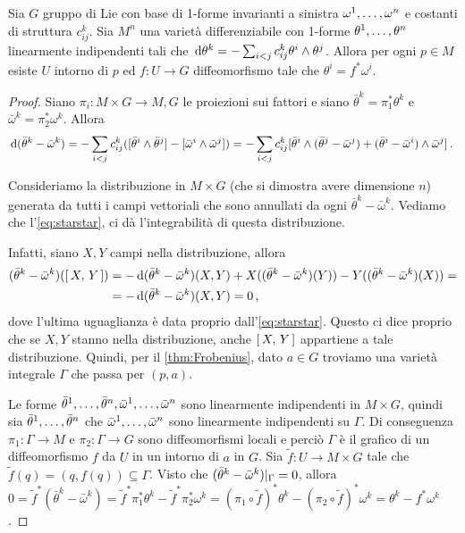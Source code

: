 \begin{theorem}
	Sia $G$ gruppo di Lie con base di 1-forme invarianti a sinistra $\seqa \omega n,$ e costanti di struttura $c_{ij}^k$. Sia $M^n$ una varietà differenziabile con 1-forme $\seqa \theta n,$ linearmente indipendenti tali che $\de \theta^k = - \sum_{i<j} c_{ij}^k \theta^i\wedge \theta^j$.
	Allora per ogni $p\in M$ esiste $U$ intorno di $p$ ed $f: U \to G$ diffeomorfismo tale che $\theta^i = f^*\omega^i$. 
\end{theorem}
\begin{proof}
	Siano $\pi_i : M \times G\to M,G$ le proiezioni sui fattori e siano $\bar\theta^k = \pi_1^*\theta^k$ e $\bar \omega^k = \pi_2^* \omega^k$.
	Allora
	\begin{equation} \label{eq:starstar}
		\de (\bar \theta^k - \bar \omega^k) = -\sum_{i<j} c_{ij}^k ([\bar \theta^i \wedge \bar \theta^j] - [\bar \omega^i \wedge \bar \omega^j]) = - \sum_{i<j} c_{ij}^k [\bar \theta^i \wedge (\bar\theta^j - \bar \omega^j) + (\bar\theta^i - \bar \omega^i)\wedge \bar \omega^j] \punto
	\end{equation}
	
	Consideriamo la distribuzione in $M\times G$ (che si dimostra avere dimensione $n$) generata da tutti i campi vettoriali che sono annullati da ogni $\bar \theta^k - \bar \omega^k$. Vediamo che l'\cref{eq:starstar}, ci dà l'integrabilità di questa distribuzione.
	
	Infatti, siano $X,Y$ campi nella distribuzione, allora
		\begin{align*}
			(\bar\theta^k - \bar\omega^k) (\comm{X}{ Y}) &= -\de (\bar\theta^k - \bar\omega^k)(X, Y) + X((\bar\theta^k - \bar\omega^k)(Y)) - Y((\bar\theta^k - \bar\omega^k) (X)) =\\
			&= - \de (\bar\theta^k - \bar\omega^k) (X,Y) = 0\virgola
		\end{align*}
		dove l'ultima uguaglianza è data proprio dall'\cref{eq:starstar}. Questo ci dice proprio che se $X,Y$ stanno nella distribuzione, anche $\comm XY$ appartiene a tale distribuzione.	
	Quindi, per il \cref{thm:Frobenius}, dato $a \in G$ troviamo una varietà integrale $\Gamma$ che passa per $(p,a)$.
	
	Le forme $\seqa {\bar \theta}n, , \seqa {\bar\omega}n,$ sono linearmente indipendenti in $M\times G$, quindi sia $\seqa{\bar\theta}n,$ che $\seqa {\bar\omega}n,$ sono linearmente indipendenti su $\Gamma$.
	Di conseguenza $\pi_1: \Gamma \to M$ e $\pi_2: \Gamma \to G$ sono diffeomorfismi locali e perciò $\Gamma$ è il grafico di un diffeomorfismo $f$ da $U$ in un intorno di $a$ in $G$.
	Sia $\tilde f: U \to M\times G$ tale che $\tilde f(q) = (q,f(q)) \subseteq \Gamma$.
	Visto che $(\bar\theta^k - \bar\omega^k)\restrict \Gamma = 0$, allora $0 = \tilde f^*(\bar\theta^k - \bar\omega^k) = \tilde f^* \pi_1^*\theta^k - \tilde f^* \pi_2^*\omega^k = (\pi_1\circ \tilde f)^* \theta^k - (\pi_2 \circ \tilde f)^* \omega^k = \theta^k - f^* \omega^k$.
\end{proof}


